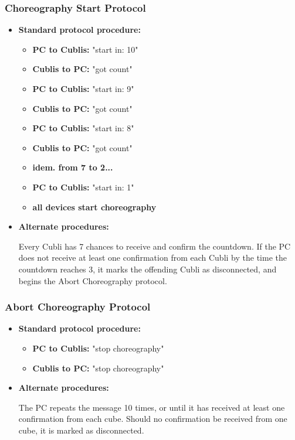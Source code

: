 \subsubsection{Choreography Start Protocol}

\begin{itemize}
\item[] \textbf{Standard protocol procedure:}

\begin{itemize}
\item[] \textbf{PC to Cublis:} "start in: 10"
\item[] \textbf{Cublis to PC:} "got count"
\item[] \textbf{PC to Cublis:} "start in:  9"
\item[] \textbf{Cublis to PC:} "got count"
\item[] \textbf{PC to Cublis:} "start in:  8"
\item[] \textbf{Cublis to PC:} "got count"
\item[] \textbf{idem. from 7 to 2...}
\item[] \textbf{PC to Cublis:} "start in:  1"
\item[] \textbf{all devices start choreography}
\end{itemize}

\item[] \textbf{Alternate procedures:}

Every Cubli has 7 chances to receive and confirm the countdown. If the PC does not receive at least one confirmation from each Cubli by the time the countdown reaches 3, it marks the offending Cubli as disconnected, and begins the Abort Choreography protocol.

\end{itemize}

\subsubsection{Abort Choreography Protocol}

\begin{itemize}
\item[] \textbf{Standard protocol procedure:}

\begin{itemize}
\item[] \textbf{PC to Cublis:} "stop choreography"
\item[] \textbf{Cublis to PC:} "stop choreography"
\end{itemize}

\item[] \textbf{Alternate procedures:}

The PC repeats the message 10 times, or until it has received at least one confirmation from each cube. Should no confirmation be received from one cube, it is marked as disconnected.

\end{itemize}

